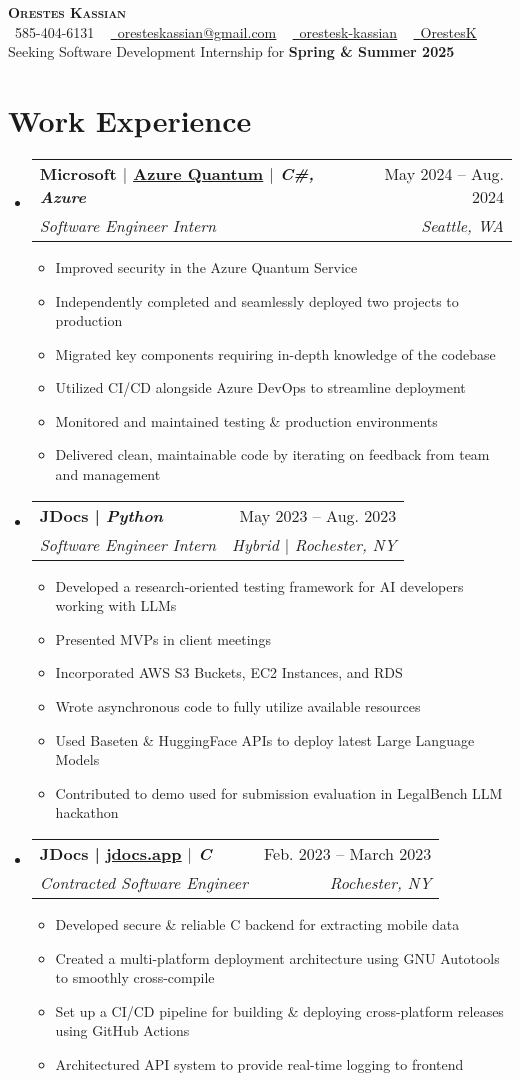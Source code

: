 \documentclass[letterpaper,11pt]{article}
\makeatletter
\newcommand{\resumeItem}[1]{
  \item\small{
    {#1 \vspace{-2pt}}
  }
}
\newcommand{\resumeSubheading}[4]{
  \vspace{-2pt}\item
    \begin{tabular*}{0.97\textwidth}[t]{l@{\extracolsep{\fill}}r}
      \textbf{#1} & #2 \\
      \textit{\small#3} & \textit{\small #4} \\
    \end{tabular*}\vspace{-7pt}
}
\newcommand{\resumeSubHeadingListStart}{\begin{itemize}[leftmargin=0.15in, label={}]}
\newcommand{\resumeSubHeadingListEnd}{\end{itemize}}
\newcommand{\resumeItemListStart}{\begin{itemize}}
\newcommand{\resumeItemListEnd}{\end{itemize}\vspace{-5pt}}
\makeatother
\begin{document}
\begin{center}
    \textbf{\fontsize{22}{22} \scshape Orestes Kassian} \\ \vspace{4pt}
    \small 
    \faPhone\ 585-404-6131 ~
    \href{mailto:oresteskassian@gmail.com}{\faEnvelope\ \uline{oresteskassian@gmail.com}} ~
    \href{https://linkedin.com/in/orestes-kassian}{\faLinkedin\ \uline{orestesk-kassian}} ~
    \href{https://github.com/OrestesK}{\faGithub\ \uline{OrestesK}} \\ 
    \vspace{6pt}
    Seeking Software Development Internship for \textbf{Spring \& Summer 2025}
\end{center}
\vspace{-20pt}

\section{Work Experience}
\resumeSubHeadingListStart
    \resumeSubheading
    {\textbf{Microsoft} $|$ \normalfont \href{https://quantum.microsoft.com/}{\uline{Azure Quantum}} $|$ \emph{C\#, Azure}}
        { May 2024 -- Aug. 2024}
        {Software Engineer Intern}{ Seattle, WA}
    \resumeItemListStart
        \resumeItem{Improved security in the Azure Quantum Service}
        \resumeItem{Independently completed and seamlessly deployed two projects to production}
        \resumeItem{Migrated key components requiring in-depth knowledge of the codebase}
        \resumeItem{Utilized CI/CD alongside Azure DevOps to streamline deployment}
        \resumeItem{Monitored and maintained testing \& production environments}
        \resumeItem{Delivered clean, maintainable code by iterating on feedback from team and management}
    \resumeItemListEnd
    \resumeSubheading
    {\textbf{JDocs} | \normalfont \emph{Python}}
        { May 2023 -- Aug. 2023}
        {Software Engineer Intern}{ Hybrid $|$ Rochester, NY}
    \resumeItemListStart
        \resumeItem{Developed a research-oriented testing framework for AI developers working with LLMs}
        \resumeItem{Presented MVPs in client meetings}
        \resumeItem{Incorporated AWS S3 Buckets, EC2 Instances, and RDS}
        \resumeItem{Wrote asynchronous code to fully utilize available resources}
        \resumeItem{Used Baseten \& HuggingFace APIs to deploy latest Large Language Models}
        \resumeItem{Contributed to demo used for submission evaluation in LegalBench LLM hackathon}
    \resumeItemListEnd
    \resumeSubheading
        {\textbf{JDocs} | \normalfont \href{https://www.jdocs.app/}{\uline{jdocs.app}} $|$ \emph{C}}
        { Feb. 2023 -- March 2023}
        {Contracted Software Engineer}{ Rochester, NY}
    \resumeItemListStart
        \resumeItem{Developed secure \& reliable C backend for extracting mobile data}
        \resumeItem{Created a multi-platform deployment architecture using GNU Autotools to smoothly cross-compile}
        \resumeItem{Set up a CI/CD pipeline for building \& deploying cross-platform releases using GitHub Actions}
        \resumeItem{Architectured API system to provide real-time logging to frontend}
    \resumeItemListEnd
\resumeSubHeadingListEnd
\end{document}

